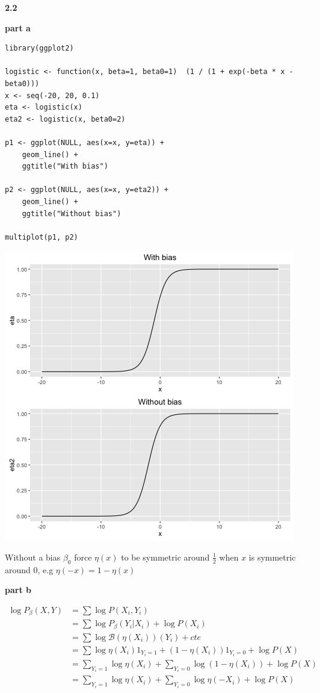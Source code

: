 \documentclass[11pt]{article}
\begin{document}
\textbf{2.2}

\textbf{part a}
\begin{verbatim}
library(ggplot2)

logistic <- function(x, beta=1, beta0=1)  (1 / (1 + exp(-beta * x - beta0)))
x <- seq(-20, 20, 0.1)
eta <- logistic(x)
eta2 <- logistic(x, beta0=2)

p1 <- ggplot(NULL, aes(x=x, y=eta)) +
    geom_line() +
    ggtitle("With bias")

p2 <- ggplot(NULL, aes(x=x, y=eta2)) +
    geom_line() +
    ggtitle("Without bias")

multiplot(p1, p2)
\end{verbatim}

\begin{center}
\includegraphics[width=.9\linewidth]{logistic.png}
\end{center}


Without a bias \(\beta_0\) force \(\eta(x)\) to be symmetric around \(\frac12\) when \(x\) is symmetric around \(0\), e.g \(\eta(-x) = 1 - \eta(x)\)

\textbf{part b}

\begin{align*}
\log P_{\beta}(X, Y)
&= \sum \log P(X_i, Y_i)
\\&= \sum \log P_{\beta}(Y_i | X_i) + \log P(X_i)
\\&= \sum \log \mathcal B(\eta(X_i))(Y_i) + cte
\\&= \sum \log \eta(X_i) 1_{Y_i=1} + (1-\eta(X_i))1_{Y_i = 0} + \log P(X)
\\&= \sum_{Y_i=1} \log \eta(X_i) + \sum_{Y_i=0} \log (1 - \eta(X_i)) + \log P(X)
\\&= \sum_{Y_i=1} \log \eta(X_i) + \sum_{Y_i=0} \log \eta(-X_i) + \log P(X)
\end{align*}
\end{document}
